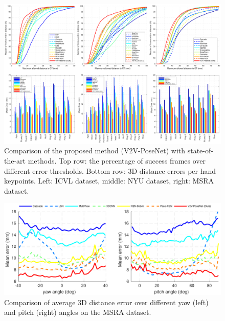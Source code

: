 \begin{figure}
\begin{center}
\includegraphics[width=1.0\linewidth]{comparison_with_stoa.pdf}
\end{center}
\vspace*{-5mm}
   \caption{Comparison of the proposed method (V2V-PoseNet) with state-of-the-art methods. Top row: the percentage of success frames over different error thresholds. Bottom row: 3D distance errors per hand keypoints. Left: ICVL dataset, middle: NYU dataset, right: MSRA dataset.}
\label{fig:comparison_with_stoa}
\end{figure}

\begin{figure}[t]
\begin{center}
   \includegraphics[width=1.0\linewidth]{msra_yaw_pitch.pdf}
\end{center}
\vspace*{-5mm}
   \caption{Comparison of average 3D distance error over different yaw (left) and pitch (right) angles on the MSRA dataset.}
\vspace*{-3mm}
\label{fig:msra_yaw_pitch}
\end{figure}


